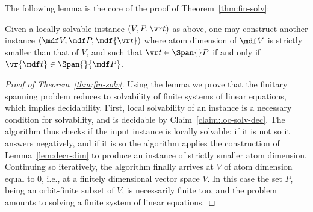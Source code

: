 %

The following lemma is the core of the proof of Theorem~\ref{thm:fin-solv}:
%
\begin{lemma} \label{lem:decr-dim}
Given a locally solvable instance $(V, P, \vr t)$ as above,
one may construct another %
instance $(\mdf V, \mdf P, \mdf{\vr t})$ 
where atom dimension of $\mdf V$ is strictly smaller  
than that of $V$, and such that $\vr t \in \Span {} P$ if and only if \,$\vr {\mdf t} \in \Span {} {\mdf P}$.
\end{lemma}
%
\begin{proof}[Proof of Theorem~\ref{thm:fin-solv}]
Using the lemma we prove that the finitary spanning problem 
reduces to solvability of finite systems of linear equations, 
which implies decidability.
First, local solvability of an instance is a necessary condition for solvability, and is decidable by Claim~\ref{claim:loc-solv-dec}.
The algorithm thus checks if the input instance is locally solvable: if it is not so it answers negatively, 
and if it is so the algorithm applies the construction of Lemma~\ref{lem:decr-dim} to produce an instance
of strictly smaller atom dimension.
Continuing so iteratively, the algorithm finally
arrives at $V$ of atom dimension equal to $0$, i.e., at a finitely dimensional vector space $V$.
In this case the set $P$, being an orbit-finite subset of $V$, is necessarily finite too, and the problem amounts to solving a finite system of linear equations.
\end{proof}

